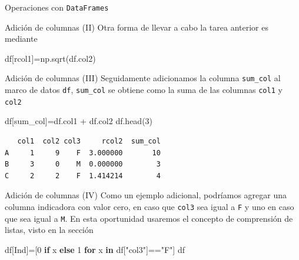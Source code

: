 \documentclass[
  ignorenonframetext,
  aspectratio=169,
  spanish,
]{beamer}
\newenvironment{Shaded}{\begin{snugshade}}{\end{snugshade}}
\newcommand{\ControlFlowTok}[1]{\textcolor[rgb]{0.00,0.23,0.31}{\textbf{#1}}}
\newcommand{\DecValTok}[1]{\textcolor[rgb]{0.68,0.00,0.00}{#1}}
\newcommand{\KeywordTok}[1]{\textcolor[rgb]{0.00,0.23,0.31}{\textbf{#1}}}
\newcommand{\NormalTok}[1]{\textcolor[rgb]{0.00,0.23,0.31}{#1}}
\newcommand{\OperatorTok}[1]{\textcolor[rgb]{0.37,0.37,0.37}{#1}}
\newcommand{\StringTok}[1]{\textcolor[rgb]{0.13,0.47,0.30}{#1}}
\begin{document}
\begin{frame}[fragile]{Operaciones con \texttt{DataFrames}}
\begin{block}{Adición de columnas (II)}
\label{adiciuxf3n-de-columnas-ii}
Otra forma de llevar a cabo la tarea anterior es mediante

\begin{Shaded}
\begin{Highlighting}[]
\NormalTok{df[}\StringTok{\textquotesingle{}rcol1\textquotesingle{}}\NormalTok{]}\OperatorTok{=}\NormalTok{np.sqrt(df.col2)  }
\end{Highlighting}
\end{Shaded}
\end{block}

\begin{block}{Adición de columnas (III)}
\label{adiciuxf3n-de-columnas-iii}
Seguidamente adicionamos la columna \texttt{sum\_col} al marco de datos
\texttt{df}, \texttt{sum\_col} se obtiene como la suma de las columnas
\texttt{col1} y \texttt{col2}

\begin{Shaded}
\begin{Highlighting}[]
\NormalTok{df[}\StringTok{\textquotesingle{}sum\_col\textquotesingle{}}\NormalTok{]}\OperatorTok{=}\NormalTok{df.col1 }\OperatorTok{+}\NormalTok{ df.col2 }
\NormalTok{df.head(}\DecValTok{3}\NormalTok{)}
\end{Highlighting}
\end{Shaded}

\begin{verbatim}
   col1  col2 col3     rcol2  sum_col
A     1     9    F  3.000000       10
B     3     0    M  0.000000        3
C     2     2    F  1.414214        4
\end{verbatim}
\end{block}

\begin{block}{Adición de columnas (IV)}
\label{adiciuxf3n-de-columnas-iv}
Como un ejemplo adicional, podríamos agregar una columna indicadora con
valor cero, en caso que \texttt{col3} sea igual a \texttt{F} y uno en
caso que sea igual a \texttt{M}. En esta oportunidad usaremos el
concepto de comprensión de listas, visto en la sección

\begin{Shaded}
\begin{Highlighting}[]
\NormalTok{df[}\StringTok{\textquotesingle{}Ind\textquotesingle{}}\NormalTok{]}\OperatorTok{=}\NormalTok{[}\DecValTok{0} \ControlFlowTok{if}\NormalTok{ x  }\ControlFlowTok{else} \DecValTok{1} \ControlFlowTok{for}\NormalTok{ x }\KeywordTok{in}\NormalTok{ df[}\StringTok{"col3"}\NormalTok{]}\OperatorTok{==}\StringTok{"F"}\NormalTok{]}
\NormalTok{df}
\end{Highlighting}
\end{Shaded}


\end{block}
\end{frame}
\end{document}
